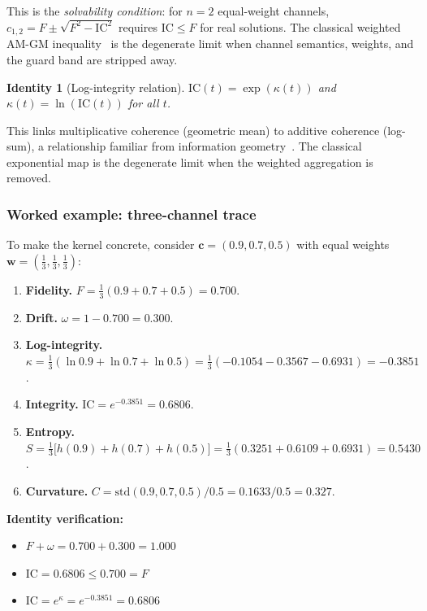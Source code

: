\documentclass[
  aps,
  prd,
  twocolumn,
  superscriptaddress,
  nofootinbib,
  floatfix
]{revtex4-2}
\newtheorem{identity}[theorem]{Identity}
\newcommand{\tvec}{\mathbf{c}}
\newcommand{\wvec}{\mathbf{w}}
\newcommand{\IC}{\mathrm{IC}}
\begin{document}
\noindent This is the \emph{solvability condition}: for $n = 2$
equal-weight channels, $c_{1,2} = F \pm \sqrt{F^2 - \IC^2}$
requires $\IC \leq F$ for real solutions.  The classical weighted
AM-GM inequality~\cite{hardylittlewoodpolya1952} is the degenerate
limit when channel semantics, weights, and the guard band are
stripped away.

\begin{identity}[Log-integrity relation]
\label{id:logint}
$\IC(t) = \exp(\kappa(t))$ and $\kappa(t) = \ln(\IC(t))$ for
all $t$.
\end{identity}

\noindent This links multiplicative coherence (geometric mean) to
additive coherence (log-sum), a relationship familiar from
information geometry~\cite{amari2016information}.  The classical
exponential map is the degenerate limit when the weighted
aggregation is removed.

\subsubsection{Worked example: three-channel trace}

To make the kernel concrete, consider
$\tvec = (0.9, 0.7, 0.5)$ with equal weights
$\wvec = (\tfrac{1}{3}, \tfrac{1}{3}, \tfrac{1}{3})$:

\begin{enumerate}[leftmargin=*,label=\textbf{\arabic*.}]
\item \textbf{Fidelity.}
  $F = \tfrac{1}{3}(0.9 + 0.7 + 0.5) = 0.700$.
\item \textbf{Drift.}
  $\omega = 1 - 0.700 = 0.300$.
\item \textbf{Log-integrity.}
  $\kappa = \tfrac{1}{3}(\ln 0.9 + \ln 0.7 + \ln 0.5)
  = \tfrac{1}{3}(-0.1054 - 0.3567 - 0.6931)
  = -0.3851$.
\item \textbf{Integrity.}
  $\IC = e^{-0.3851} = 0.6806$.
\item \textbf{Entropy.}
  $S = \tfrac{1}{3}\bigl[h(0.9) + h(0.7) + h(0.5)\bigr]
  = \tfrac{1}{3}(0.3251 + 0.6109 + 0.6931) = 0.5430$.
\item \textbf{Curvature.}
  $C = \mathrm{std}(0.9\!, 0.7\!, 0.5)/0.5 =
  0.1633/0.5 = 0.327$.
\end{enumerate}

\noindent\textbf{Identity verification:}
\begin{itemize}[leftmargin=*]
\item $F + \omega = 0.700 + 0.300 = 1.000$ \quad\checkmark
\item $\IC = 0.6806 \leq 0.700 = F$ \quad\checkmark
\item $\IC = e^\kappa = e^{-0.3851} = 0.6806$ \quad\checkmark
\end{itemize}
\end{document}
